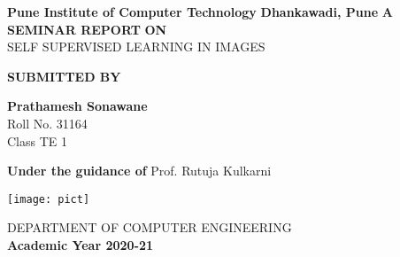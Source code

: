 \documentclass[a4paper, 12pt]{article}
\begin{document}
 
\begin{titlepage}
    \begin{center}
        \vspace*{1cm}
        
        \large
                \textbf{Pune Institute of Computer Technology}	
                \linebreak
		\textbf{Dhankawadi, Pune}
        \vspace{0.5cm}
                        \linebreak
                        \linebreak
        \textbf{A SEMINAR REPORT }
        \linebreak
        \textbf{ON }
        \linebreak
        \vspace{0.5cm}
        \large
        \\SELF SUPERVISED LEARNING IN IMAGES 
        \linebreak
        \linebreak
		
		\textbf{SUBMITTED BY}
		\vspace{1cm}
		
        \textbf{ Prathamesh Sonawane }
        \\ Roll No. 31164   
        \\ Class TE 1
        \linebreak
        \linebreak
		        
        \textbf{\large{Under the guidance of}}
		\linebreak
	    Prof. Rutuja Kulkarni
		\linebreak
        
        
        
        \vspace{0.8cm}
        

        \texttt{[image: pict]}   
        
        \Large
        DEPARTMENT OF COMPUTER ENGINEERING\\
		\textbf{Academic Year 2020-21}
        
    \end{center}
\end{titlepage}
\pagebreak
\end{document}
